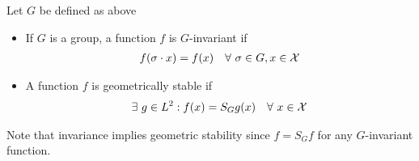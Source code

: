 \begin{definition}
    Let $G$ be defined as above
    \begin{itemize}
        \item If $G$ is a group, a function $f$ is $G$-invariant if
    \begin{align}
        f(\sigma\cdot x) = f(x)\quad \forall\ \sigma\in G,x\in \mathcal{X}
    \end{align}
        \item A function $f$ is geometrically stable if
    \begin{align}
        \exists\ g\in L^2:f(x) = S_Gg(x)\quad \forall\ x\in \mathcal{X}
    \end{align}
    \end{itemize}
    Note that invariance implies geometric stability since $f = S_Gf$ for any $G$-invariant function.
\end{definition}

